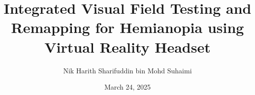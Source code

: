 \documentclass{l4proj}
\begin{document}
\title{Integrated Visual Field Testing and Remapping for Hemianopia using Virtual Reality Headset} %
\author{Nik Harith Sharifuddin bin Mohd Suhaimi}
\date{March 24, 2025}

\maketitle

\begin{abstract}



\end{abstract}
\end{document}

